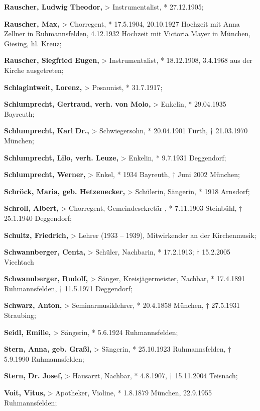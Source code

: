 \documentclass[a4paper]{article}
\begin{document}
\textbf{Rauscher, Ludwig Theodor,} {\textgreater} Instrumentalist, *
27.12.1905;

\textbf{Rauscher, Max,} {\textgreater} Chorregent, * 17.5.1904,
20.10.1927 Hochzeit mit Anna Zellner in Ruhmannsfelden, 4.12.1932
Hochzeit mit Victoria Mayer in München, Giesing, hl. Kreuz;

\textbf{Rauscher, Siegfried Eugen,} {\textgreater} Instrumentalist, *
18.12.1908, 3.4.1968 aus der Kirche ausgetreten;

\textbf{Schlagintweit, Lorenz,} {\textgreater} Posaunist, * 31.7.1917;

\textbf{Schlumprecht, Gertraud, verh. von Molo,} {\textgreater} Enkelin,
* 29.04.1935 Bayreuth;

\textbf{Schlumprecht, Karl} \textbf{Dr.,} {\textgreater} Schwiegersohn,
* 20.04.1901 Fürth, † 21.03.1970 München;

\textbf{Schlumprecht, Lilo, verh. Leuze,} {\textgreater} Enkelin, *
9.7.1931 Deggendorf;

\textbf{Schlumprecht, Werner,} {\textgreater} Enkel, * 1934 Bayreuth, †
Juni 2002 München;

\textbf{Schröck, Maria, geb. Hetzenecker,} {\textgreater} Schülerin,
Sängerin, * 1918 Arnsdorf;

\textbf{Schroll, Albert, }{\textgreater} Chorregent, Gemeindesekretär
,\textbf{ }* 7.11.1903 Steinbühl,  † 25.1.1940 Deggendorf;

\textbf{Schultz, Friedrich,} {\textgreater} Lehrer (1933 – 1939),
Mitwirkender an der Kirchenmusik;

\textbf{Schwannberger, Centa,} {\textgreater} Schüler, Nachbarin, *
17.2.1913; † 15.2.2005 Viechtach

\textbf{Schwannberger, Rudolf,} {\textgreater} Sänger,
Kreisjägermeister, Nachbar, * 17.4.1891 Ruhmannsfelden, † 11.5.1971
Deggendorf;

\textbf{Schwarz, Anton,} {\textgreater} Seminarmusiklehrer, * 20.4.1858
München, † 27.5.1931 Straubing;

\textbf{Seidl, Emilie,} {\textgreater} Sängerin, * 5.6.1924
Ruhmannsfelden;

\textbf{Stern, Anna, geb. Graßl,} {\textgreater} Sängerin, * 25.10.1923
Ruhmannsfelden, † 5.9.1990 Ruhmannsfelden;

\textbf{Stern, Dr. Josef,} {\textgreater} Hausarzt, Nachbar, * 4.8.1907,
† 15.11.2004 Teisnach;

\textbf{Voit, Vitus,} {\textgreater} Apotheker, Violine, * 1.8.1879
München, 22.9.1955 Ruhmannsfelden;
\end{document}
